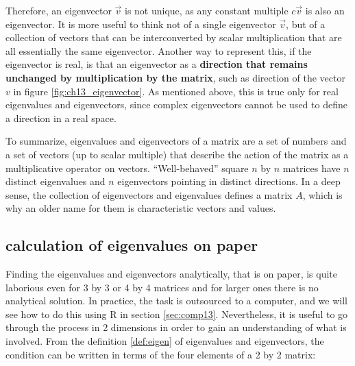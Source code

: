 \documentclass[
  letterpaper,
  DIV=11,
  numbers=noendperiod]{scrreprt}
\begin{document}
Therefore, an eigenvector \(\vec v\) is not unique, as any constant
multiple \(c \vec v\) is also an eigenvector. It is more useful to think
not of a single eigenvector \(\vec v\), but of a collection of vectors
that can be interconverted by scalar multiplication that are all
essentially the same eigenvector. Another way to represent this, if the
eigenvector is real, is that an eigenvector as a \textbf{direction that
remains unchanged by multiplication by the matrix}, such as direction of
the vector \(v\) in figure \ref{fig:ch13_eigenvector}. As mentioned
above, this is true only for real eigenvalues and eigenvectors, since
complex eigenvectors cannot be used to define a direction in a real
space.

To summarize, eigenvalues and eigenvectors of a matrix are a set of
numbers and a set of vectors (up to scalar multiple) that describe the
action of the matrix as a multiplicative operator on vectors.
``Well-behaved'' square \(n\) by \(n\) matrices have \(n\) distinct
eigenvalues and \(n\) eigenvectors pointing in distinct directions. In a
deep sense, the collection of eigenvectors and eigenvalues defines a
matrix \(A\), which is why an older name for them is characteristic
vectors and values.

\hypertarget{calculation-of-eigenvalues-on-paper}{%
\subsection{calculation of eigenvalues on
paper}\label{calculation-of-eigenvalues-on-paper}}

Finding the eigenvalues and eigenvectors analytically, that is on paper,
is quite laborious even for 3 by 3 or 4 by 4 matrices and for larger
ones there is no analytical solution. In practice, the task is
outsourced to a computer, and we will see how to do this using R in
section \ref{sec:comp13}. Nevertheless, it is useful to go through the
process in 2 dimensions in order to gain an understanding of what is
involved. From the definition \ref{def:eigen} of eigenvalues and
eigenvectors, the condition can be written in terms of the four elements
of a 2 by 2 matrix:
\end{document}
